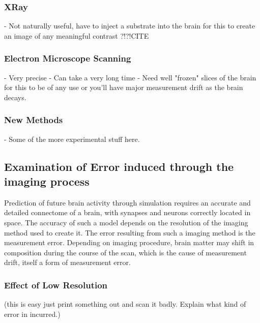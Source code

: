 \subsubsection*{XRay}

- Not naturally useful, have to inject a substrate into the brain for this to
create an image of any meaningful contrast ?!?!CITE

\subsubsection*{Electron Microscope Scanning}

- Very precise
- Can take a very long time
- Need well "frozen" slices of the brain for this to be of any use or you'll
have major measurement drift as the brain decays.

\subsubsection*{New Methods}

- Some of the more experimental stuff here.

\subsection[Error induced through noise]{Examination of Error induced through the imaging process}

Prediction of future brain activity through simulation requires an accurate and
detailed connectome of a brain, with synapses and neurons correctly located in
space.\autocite{bostrom_whole_2008} The accuracy of such a model depends on the
resolution of the imaging method used to create it. The error resulting from
such a imaging method is the measurement error. Depending on imaging procedure, brain matter may shift in composition during the course of the scan, which is the cause of measurement drift, itself a form of measurement error.



\subsubsection[Error induced through low resolution]{Effect of Low Resolution} 
(this is easy just print something out
and scan it badly. Explain what kind of error in incurred.)